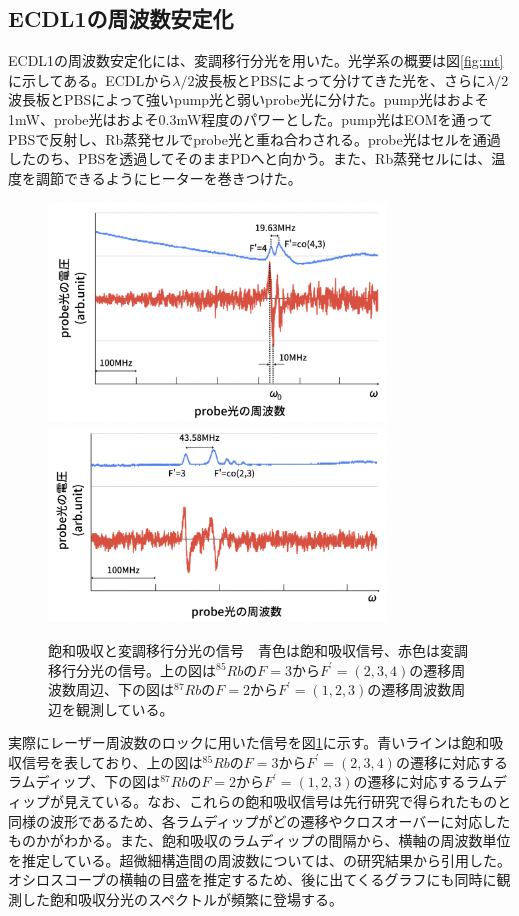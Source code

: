 \documentclass[dvipdfmx]{jsarticle}
\begin{document}
\subsection{ECDL1の周波数安定化}
ECDL1の周波数安定化には、変調移行分光を用いた。光学系の概要は図\ref{fig:mt}に示してある。ECDLから$\lambda / 2$波長板とPBSによって分けてきた光を、さらに$\lambda / 2$波長板とPBSによって強いpump光と弱いprobe光に分けた。pump光はおよそ1mW、probe光はおよそ0.3mW程度のパワーとした。pump光はEOMを通ってPBSで反射し、Rb蒸発セルでprobe光と重ね合わされる。probe光はセルを通過したのち、PBSを透過してそのままPDへと向かう。また、Rb蒸発セルには、温度を調節できるようにヒーターを巻きつけた。
\begin{figure}
\centering
\includegraphics[width=0.8\textwidth]{images/mt85_graph.png}
\includegraphics[width=0.8\textwidth]{images/mt87_graph.png}
\caption{\label{fig:mt-graph}飽和吸収と変調移行分光の信号　青色は飽和吸収信号、赤色は変調移行分光の信号。上の図は$^{85}Rb$の$F=3$から$F^{'}=(2,3,4)$の遷移周波数周辺、下の図は$^{87}Rb$の$F=2$から$F^{'}=(1,2,3)$の遷移周波数周辺を観測している。}
\end{figure}
実際にレーザー周波数のロックに用いた信号を図\ref{fig:mt-graph}に示す。青いラインは飽和吸収信号を表しており、上の図は$^{85}Rb$の$F=3$から$F^{'}=(2,3,4)$の遷移に対応するラムディップ、下の図は$^{87}Rb$の$F=2$から$F^{'}=(1,2,3)$の遷移に対応するラムディップが見えている。なお、これらの飽和吸収信号は先行研究\cite{takase-y}\cite{1.6}で得られたものと同様の波形であるため、各ラムディップがどの遷移やクロスオーバーに対応したものかがわかる。また、飽和吸収のラムディップの間隔から、横軸の周波数単位を推定している。超微細構造間の周波数については、\cite{hyperfine}の研究結果から引用した。オシロスコープの横軸の目盛を推定するため、後に出てくるグラフにも同時に観測した飽和吸収分光のスペクトルが頻繁に登場する。
\end{document}
